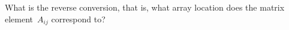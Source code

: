   What is the reverse conversion, that is, what array location
   does the matrix element~$A_{ij}$ correspond to?
